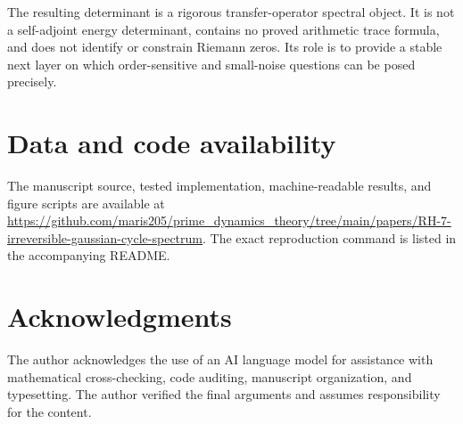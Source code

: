 \documentclass[11pt]{article}
\theoremstyle{definition}
\theoremstyle{remark}
\begin{document}
The resulting determinant is a rigorous transfer-operator spectral object.
It is not a self-adjoint energy determinant, contains no proved arithmetic
trace formula, and does not identify or constrain Riemann zeros.  Its role is
to provide a stable next layer on which order-sensitive and small-noise
questions can be posed precisely.

\section*{Data and code availability}

The manuscript source, tested implementation, machine-readable results, and
figure scripts are available at
\url{https://github.com/maris205/prime_dynamics_theory/tree/main/papers/RH-7-irreversible-gaussian-cycle-spectrum}.
The exact reproduction command is listed in the accompanying README.

\section*{Acknowledgments}

The author acknowledges the use of an AI language model for assistance with
mathematical cross-checking, code auditing, manuscript organization, and
typesetting.  The author verified the final arguments and assumes
responsibility for the content.

{\small


}
\end{document}
